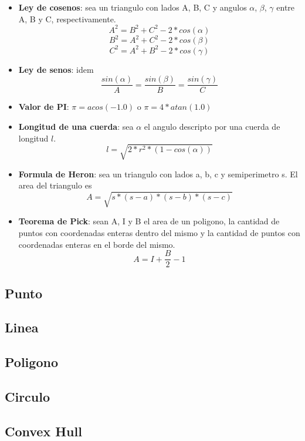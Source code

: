 \documentclass[a4paper,11pt,landscape,twocolumn]{article}
\begin{document}
\begin{itemize}
  \item \textbf{Ley de cosenos}: sea un triangulo con lados A, B, C y angulos $\alpha$, $\beta$, $\gamma$ entre A, B y C, respectivamente.
  $$A^2=B^2+C^2-2*cos(\alpha)$$
  $$B^2=A^2+C^2-2*cos(\beta)$$
  $$C^2=A^2+B^2-2*cos(\gamma)$$
  \item \textbf{Ley de senos}: idem
  $$\frac{sin(\alpha)}{A}=\frac{sin(\beta)}{B}=\frac{sin(\gamma)}{C}$$
  \item \textbf{Valor de PI}: $\pi=acos(-1.0)$ o $\pi=4*atan(1.0)$
  \item \textbf{Longitud de una cuerda}: sea $\alpha$ el angulo descripto por una cuerda de longitud $l$.
  $$l=\sqrt{2*r^2*(1-cos(\alpha))}$$
  \item \textbf{Formula de Heron}: sea un triangulo con lados a, b, c y semiperimetro s. El area del triangulo es
  $$A=\sqrt{s*(s-a)*(s-b)*(s-c)}$$
  \item \textbf{Teorema de Pick}: sean A, I y B el area de un poligono, la cantidad de puntos con coordenadas enteras dentro del mismo y la cantidad de puntos con coordenadas enteras en el borde del mismo.
  $$A=I+\frac{B}{2}-1$$
\end{itemize}

\subsection{Punto}



\subsection{Linea}



\subsection{Poligono}



\subsection{Circulo}



\subsection{Convex Hull}
\end{document}
